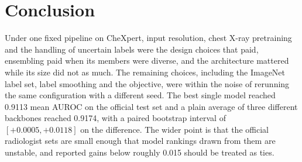 \documentclass{article}
\begin{document}
\section{Conclusion}

Under one fixed pipeline on CheXpert, input resolution, chest X-ray pretraining and the
handling of uncertain labels were the design choices that paid, ensembling paid when its
members were diverse, and the architecture mattered while its size did not as much. The
remaining choices, including the ImageNet label set, label smoothing and the objective,
were within the noise of rerunning the same configuration with a different seed. The best
single model reached 0.9113 mean AUROC on the official test set and a plain average of
three different backbones reached 0.9174, with a paired bootstrap interval of
$[+0.0005, +0.0118]$ on the difference. The wider point is that the official radiologist
sets are small enough that model rankings drawn from them are unstable, and reported
gains below roughly 0.015 should be treated as ties.




\appendix

\end{document}
